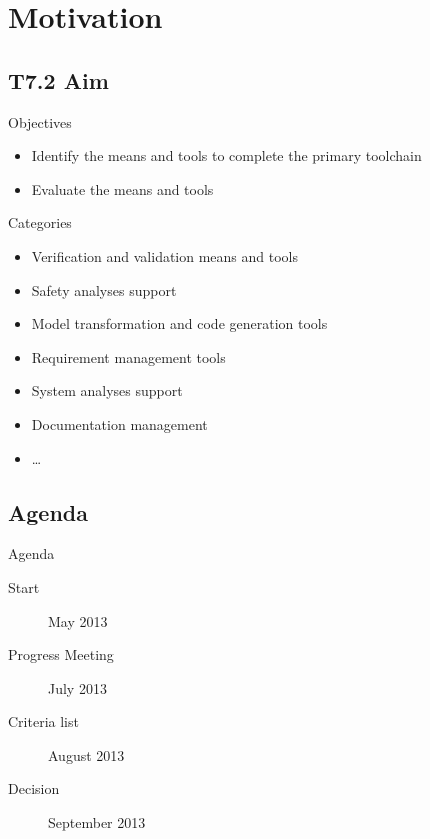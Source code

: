 
\section{Motivation}

\subsection{T7.2 Aim}

\begin{frame}{Objectives}

  \begin{itemize}
  \item
    Identify the means and tools to complete the primary toolchain
  \item
    Evaluate the means and tools
  \end{itemize}
\end{frame}


\begin{frame}{Categories}

  \begin{itemize}
  \item
    Verification and validation means and tools
  \item
    Safety analyses support
  \item
    Model transformation and code generation tools
  \item 
  	Requirement management tools
  \item 
    System analyses support
  \item
  	Documentation management
  \item
  	\dots
  \end{itemize}
\end{frame}

\subsection{Agenda}


\begin{frame}{Agenda}
\begin{center}

\begin{description}
\item[Start] May 2013
\item[Progress Meeting] July 2013
\item[Criteria list] August 2013
\item[Decision] September 2013
\end{description}


\end{center}
\end{frame}

